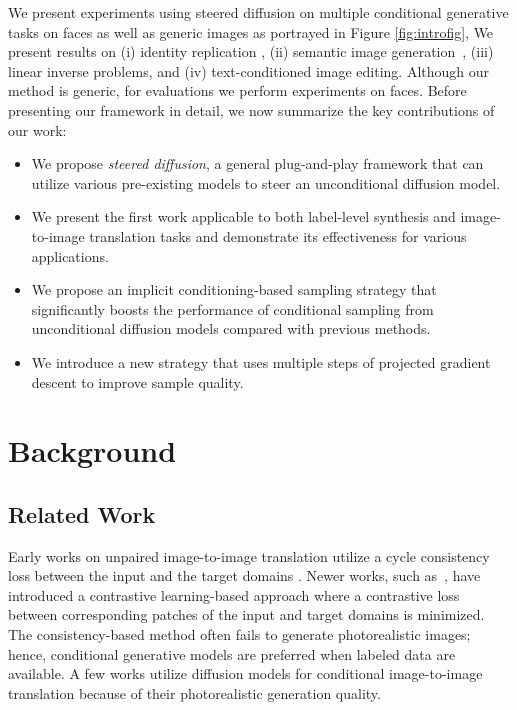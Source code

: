 \documentclass[10pt,twocolumn,letterpaper]{article}
\begin{document}
We present experiments using steered diffusion on multiple conditional generative tasks on faces as well as generic images as portrayed in Figure \ref{fig:introfig}, We present results on (i) identity replication \cite{deng2019arcface}, (ii) semantic image generation~\cite{park2019semantic}, (iii) linear inverse problems\cite{mei2022bi}, and (iv) text-conditioned image editing. Although our method is generic, for evaluations we perform experiments on faces. Before presenting our framework in detail, we now summarize the key contributions of our work:
\begin{itemize}[noitemsep]
    \item We propose {\it steered diffusion}, a general plug-and-play framework that can utilize various pre-existing models to steer an unconditional diffusion model.
    \item We present the first work applicable to both label-level synthesis and image-to-image translation tasks and demonstrate its effectiveness for various applications.
    \item We propose an implicit conditioning-based sampling strategy that significantly boosts the performance of conditional sampling from unconditional diffusion models compared with previous methods.
    \item We introduce a new strategy that uses multiple steps of projected gradient descent to improve sample quality.
 
\end{itemize}

\section{Background}

\subsection{Related Work}

Early works on unpaired image-to-image translation utilize a cycle consistency loss between the input and the target domains \cite{CycleGAN2017,FuCVPR19-GcGAN}. Newer works, such as~\cite{isola2017image}, have introduced a contrastive learning-based approach where a contrastive loss between corresponding patches of the input and target domains is minimized. The consistency-based method often fails to generate photorealistic images; hence, conditional generative models are preferred when labeled data are available. A few works \cite{saharia2021image,saharia2022image} utilize diffusion models for conditional image-to-image translation because of their photorealistic generation quality. 
\end{document}
